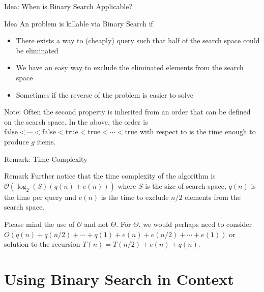\documentclass[9pt]{beamer}
\newenvironment{ideabox}{\begin{alertblock}{Idea}}{\end{alertblock}}
\newenvironment{remarkbox}{\begin{block}{Remark}}{\end{block}}
\begin{document}
\begin{frame}{Idea: When is Binary Search Applicable?}
\begin{ideabox}
An problem is killable via Binary Search if
\begin{itemize}
\item There exists a way to (cheaply) query such that half of the search space could be eliminated
\item We have an easy way to exclude the eliminated elements from the search space
\item Sometimes if the reverse of the problem is easier to solve
\end{itemize}

Note: Often the second property is inherited from an order that can be defined on the search space. In the above, the order is $\text{false} < \cdots < \text{false} < \text{true} < \text{true} < \cdots < \text{true}$ with respect to is the time enough to produce $g$ items.
\end{ideabox}
\end{frame}

\begin{frame}{Remark: Time Complexity}
\begin{remarkbox}
Further notice that the time complexity of the algorithm is $\mathcal{O}(\log_2(S)(q(n) + e(n)))$ where $S$ is the size of search space, $q(n)$ is the time per query and $e(n)$ is the time to exclude $n/2$ elements from the search space.

Please mind the use of $\mathcal{O}$ and not $\Theta$. For $\Theta$, we would perhaps need to consider $O(q(n) + q(n/2) + \cdots + q(1) + e(n) + e(n/2) + \cdots + e(1))$ or solution to the recursion $T(n) = T(n/2) + e(n) + q(n)$.
\end{remarkbox}
\end{frame}

\section{Using Binary Search in Context}
\end{document}
